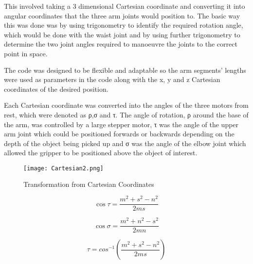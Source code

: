 This involved taking a 3 dimensional Cartesian coordinate and converting it into angular coordinates that the three arm joints would position to.  The basic way this was done was by using trigonometry to identify the required rotation angle, which would be done with the waist joint and by using further trigonometry to determine the two joint angles required to manoeuvre the joints to the correct point in space.	

The code was designed to be flexible and adaptable so the arm segments’ lengths were used as parameters in the code along with the x, y and z Cartesian coordinates of the desired position.  

Each Cartesian coordinate was converted into the angles of the three motors from rest, which were denoted as ρ,σ and τ.  The angle of rotation, ρ around the base of the arm, was controlled by a large stepper motor, τ was the angle of the upper arm joint which could be positioned forwards or backwards depending on the depth of the object being picked up and σ was the angle of the elbow joint which allowed the gripper to be positioned above the object of interest.  

\begin{figure}[!htb]
\begin{center}
\texttt{[image: Cartesian2.png]}
\end{center}
\caption{Transformation from Cartesian Coordinates}
\label{fig:cartesian}
\end{figure}

\begin{capequ}[!htb]
\begin{center}
\begin{equation}
\cos \tau = \frac{m^{2}+s^{2}-n^{2}}{2ms}
\end{equation}
\label{Equation1}
\end{center}
\end{capequ}

\begin{capequ}[!htb]
\begin{center}
\begin{equation}
\cos \sigma  = \frac{m^{2}+n^{2}-s^{2}}{2mn}
\end{equation}
\label{Equation2}
\end{center}
\end{capequ}

\begin{capequ}[!htb]
\begin{center}
\begin{equation}
\tau = cos^{-1}\left (\frac{m^{2}+s^{2}-n^{2}}{2ms}\right )
\end{equation}
\caption{}
\label{Equation6}
\end{center}
\end{capequ}

